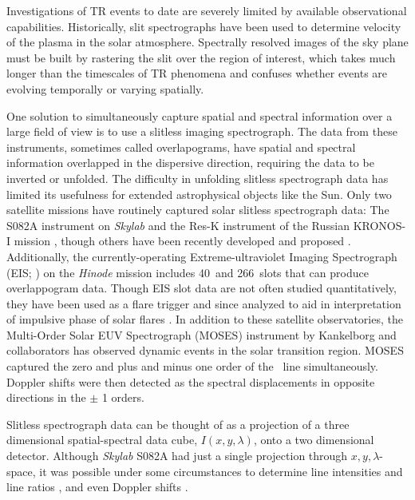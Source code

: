     Investigations of TR events to date are severely limited by available observational capabilities. 
    Historically, slit spectrographs have been used to determine velocity of the plasma in the solar atmosphere.   
    Spectrally resolved images of the sky plane must be built by rastering the slit over the region of interest, which takes much longer than the timescales of TR phenomena and confuses whether events are evolving temporally or varying spatially.  
    
    One solution to simultaneously capture spatial and spectral information over a large field of view is to use a slitless imaging spectrograph.  
    The data from these instruments, sometimes called overlapograms, have spatial and spectral information overlapped in the dispersive direction, requiring the data to be inverted or unfolded.
    The difficulty in unfolding slitless spectrograph data has limited its usefulness for extended astrophysical objects like the Sun. 
    Only two satellite missions have routinely captured solar slitless spectrograph data: The S082A instrument on {\it Skylab} \citep{Tousey1973} and the Res-K instrument of the Russian KRONOS-I mission \citep{Zhitnik1998}, though others have been recently developed and proposed \citep{winebarger2019,golub2020}. 
    Additionally, the currently-operating Extreme-ultraviolet Imaging Spectrograph (EIS; \citet{culhane2007}) on the {\it Hinode} mission \citep{kosugi2007} includes 40\arcsec\ and 266\arcsec\ slots that can produce overlappogram data.  
    Though EIS slot data are not often studied quantitatively, they have been used as a flare trigger and since analyzed to aid in interpretation of impulsive phase of solar flares \citep{harra2017,harra2020}.
    In addition to these satellite observatories, %
    the Multi-Order Solar EUV Spectrograph (MOSES) instrument by Kankelborg and collaborators \citep{Kankelborg01,Fox10,Rust2019} has observed dynamic events in the solar transition region.
    MOSES captured the zero and plus and minus one order of the \heii \ line simultaneously. 
    Doppler shifts were then detected as the spectral displacements in opposite directions in the $\pm$ 1 orders.
    
    Slitless spectrograph data can be thought of as a projection of a three dimensional spatial-spectral data cube, $I(x,y,\lambda)$, onto a two dimensional detector.  
    Although {\it Skylab} S082A had just a single projection through $x,y,\lambda$-space, it was possible under some circumstances to determine line intensities and line ratios \cite[e.g.,][]{Keenan1988, Tayal1989, Keenan2006}, and even Doppler shifts \citep{MariskaDoppler1992}. 

